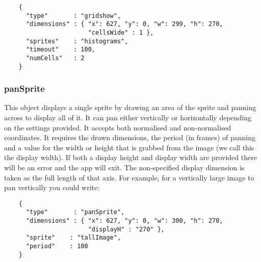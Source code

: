 \documentclass[a4paper]{article}
\begin{document}
  \begin{verbatim}
    {
      "type"       : "gridshow",
      "dimensions" : { "x": 627, "y": 0, "w": 299, "h": 270, 
                       "cellsWide" : 1 },
      "sprites"    : "histograms",
      "timeout"    : 100,
      "numCells"   : 2
    }  
  \end{verbatim}

  \subsubsection{panSprite}
  This object displays a single sprite by drawing an area of the sprite and
  panning across to display all of it. It can pan either vertically or
  horizontally depending on the settings provided. It accepts both
  normalised and non-normalised coordinates. It requires the drawn
  dimensions, the period (in frames) of panning and a value for the width
  or height that is grabbed from the image (we call this the display width).
  If both a display height and display width are provided there will be an
  error and the app will exit. The non-specified display dimension is taken
  as the full length of that axis. For example, for a vertically large image
  to pan vertically you could write:


  \begin{verbatim}
    {
      "type"       : "panSprite",
      "dimensions" : { "x": 627, "y": 0, "w": 300, "h": 270, 
                       "displayH" : "270" },
      "sprite"    : "tallImage",
      "period"    : 100
    }  
  \end{verbatim}
\end{document}
